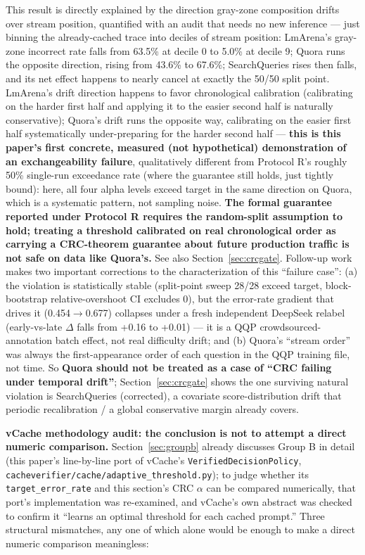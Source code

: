 \documentclass[11pt]{article}
\begin{document}
This result is directly explained by the direction gray-zone composition drifts over stream position, quantified with an audit that needs no new inference --- just binning the already-cached trace into deciles of stream position: LmArena's gray-zone incorrect rate falls from 63.5\% at decile 0 to 5.0\% at decile 9; Quora runs the opposite direction, rising from 43.6\% to 67.6\%; SearchQueries rises then falls, and its net effect happens to nearly cancel at exactly the 50/50 split point. LmArena's drift direction happens to favor chronological calibration (calibrating on the harder first half and applying it to the easier second half is naturally conservative); Quora's drift runs the opposite way, calibrating on the easier first half systematically under-preparing for the harder second half --- \textbf{this is this paper's first concrete, measured (not hypothetical) demonstration of an exchangeability failure}, qualitatively different from Protocol R's roughly 50\% single-run exceedance rate (where the guarantee still holds, just tightly bound): here, all four alpha levels exceed target in the same direction on Quora, which is a systematic pattern, not sampling noise. \textbf{The formal guarantee reported under Protocol R requires the random-split assumption to hold; treating a threshold calibrated on real chronological order as carrying a CRC-theorem guarantee about future production traffic is not safe on data like Quora's.} See also Section~\ref{sec:crcgate}. Follow-up work makes two important corrections to the characterization of this ``failure case'': (a) the violation is statistically stable (split-point sweep 28/28 exceed target, block-bootstrap relative-overshoot CI excludes 0), but the error-rate gradient that drives it (0.454$\to$0.677) collapses under a fresh independent DeepSeek relabel (early-vs-late $\Delta$ falls from +0.16 to +0.01) --- it is a QQP crowdsourced-annotation batch effect, not real difficulty drift; and (b) Quora's ``stream order'' was always the first-appearance order of each question in the QQP training file, not time. So \textbf{Quora should not be treated as a case of ``CRC failing under temporal drift''}; Section~\ref{sec:crcgate} shows the one surviving natural violation is SearchQueries (corrected), a covariate score-distribution drift that periodic recalibration / a global conservative margin already covers.

\textbf{vCache methodology audit: the conclusion is not to attempt a direct numeric comparison.} Section~\ref{sec:groupb} already discusses Group B in detail (this paper's line-by-line port of vCache's \texttt{Verified\allowbreak{}Decision\allowbreak{}Policy}, \texttt{cacheverifier/\allowbreak{}cache/\allowbreak{}adaptive\_\allowbreak{}threshold.\allowbreak{}py}); to judge whether its \texttt{target\_\allowbreak{}error\_\allowbreak{}rate} and this section's CRC $\alpha$ can be compared numerically, that port's implementation was re-examined, and vCache's own abstract was checked to confirm it ``learns an optimal threshold for each cached prompt.'' Three structural mismatches, any one of which alone would be enough to make a direct numeric comparison meaningless:
\end{document}
